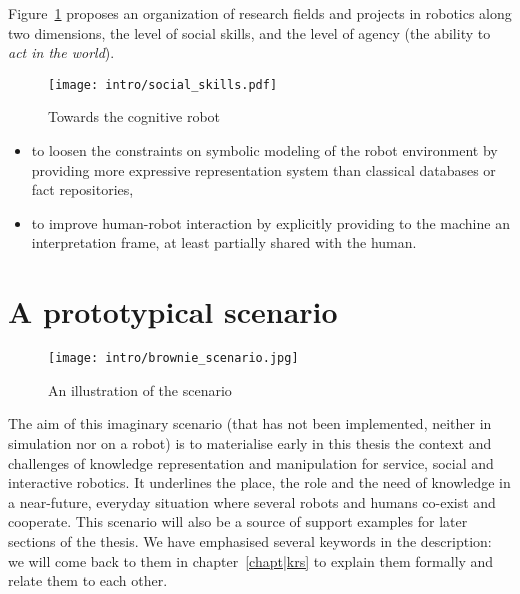 Figure~\ref{fig|cognitive-robots} proposes an organization of research fields
and projects in robotics along two dimensions, the level of social skills, and
the level of agency (the ability to \emph{act in the world}).

\begin{figure}
    \centering
    \texttt{[image: intro/social\_skills.pdf]}
    \caption{Towards the cognitive robot}
    \label{fig|cognitive-robots}
\end{figure}



\begin{itemize}
    \item to loosen the constraints on symbolic modeling of the robot
    environment by providing more expressive representation system than
    classical databases or fact repositories,

    \item to improve human-robot interaction by explicitly providing to the
    machine an interpretation frame, at least partially shared with the human.

\end{itemize}



\section{A prototypical scenario}
\label{sect|scenario}

\begin{figure*}
	\centering
	\texttt{[image: intro/brownie\_scenario.jpg]}
	\caption{An illustration of the scenario}
	\label{fig|scenario}
\end{figure*}

The aim of this imaginary scenario (that has not been implemented, neither in
simulation nor on a robot) is to materialise early in this thesis the context
and challenges of knowledge representation and manipulation for service, social
and interactive robotics. It underlines the place, the role and the need of
knowledge in a near-future, everyday situation where several robots and humans
co-exist and cooperate. This scenario will also be a source of support examples
for later sections of the thesis. We have emphasised several keywords in the
description: we will come back to them in chapter~\ref{chapt|krs} to explain
them formally and relate them to each other.

